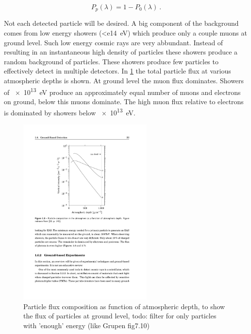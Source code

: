 \begin{equation}
    P_p(\lambda) = 1-P_0(\lambda) \ .
\end{equation}

Not each detected particle will be desired. A big component of the background comes from low energy showers (\SI{<e14}{\eV}) which produce only a couple muons at ground level. Such low energy cosmic rays are very abbundant. Instead of resulting in an instantaneous high density of particles these showers produce a random background of particles. These showers produce few particles to effectively detect in multiple detectors. In \cref{fig:particle_density} the total particle flux at various atmospheric depths is shown. At ground level the muon flux dominates. Showers of \SI{e13}{\eV} produce an approximately equal number of muons and electrons on ground, below this muons dominate. The high muon flux relative to electrons is dominated by showers below \SI{e13}{\eV}.

\begin{figure}
    \centering
    \includegraphics[width=0.6\textwidth]
                    {plots/experiment/particle_density}
    \caption{Particle flux composition as function of atmospheric depth, to show the flux of particles at ground level, todo: filter for only particles with 'enough' energy (like Grupen fig7.10)}
    \label{fig:particle_density}
\end{figure}

